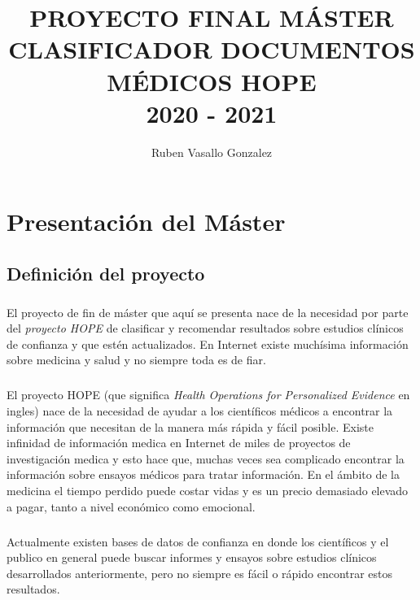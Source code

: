 \documentclass[10pt,a4paper,oneside]{book}
\author{Ruben Vasallo Gonzalez}
\title{PROYECTO FINAL MÁSTER \\ CLASIFICADOR DOCUMENTOS MÉDICOS HOPE \\ 2020 - 2021}
\begin{document}
\maketitle

\tableofcontents

\chapter{Presentación del Máster}

\section{Definición del proyecto}

\paragraph{}
El proyecto de fin de máster que aquí se presenta nace de la necesidad por parte del \textit{proyecto HOPE} de clasificar y recomendar resultados sobre estudios clínicos de confianza y que estén actualizados. En Internet existe muchísima información sobre medicina y salud y no siempre toda es de fiar.

\paragraph{}
El proyecto HOPE (que significa \textit{Health Operations for Personalized Evidence} en ingles) nace de la necesidad de ayudar a los científicos médicos a encontrar la información que necesitan de la manera más rápida y fácil posible. Existe infinidad de información medica en Internet de miles de proyectos de investigación medica y esto hace que, muchas veces sea complicado encontrar la información sobre ensayos médicos para tratar información. En el ámbito de la medicina el tiempo perdido puede costar vidas y es un precio demasiado elevado a pagar, tanto a nivel económico como emocional.

\paragraph{}
Actualmente existen bases de datos de confianza en donde los científicos y el publico en general puede buscar informes y ensayos sobre estudios clínicos desarrollados anteriormente, pero no siempre es fácil o rápido encontrar estos resultados.
\end{document}
